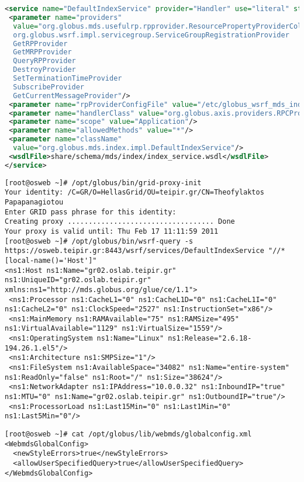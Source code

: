 \begin{lstlisting}[language=XML,caption=Web Service Deployment Descriptor for WSRF Index,label=wsrfwsdd]
<service name="DefaultIndexService" provider="Handler" use="literal" style="document">
 <parameter name="providers"
  value="org.globus.mds.usefulrp.rpprovider.ResourcePropertyProviderCollection
  org.globus.wsrf.impl.servicegroup.ServiceGroupRegistrationProvider
  GetRPProvider
  GetMRPProvider
  QueryRPProvider
  DestroyProvider
  SetTerminationTimeProvider
  SubscribeProvider
  GetCurrentMessageProvider"/>
 <parameter name="rpProviderConfigFile" value="/etc/globus_wsrf_mds_index/rpprovider-config-gluece.xml"/>
 <parameter name="handlerClass" value="org.globus.axis.providers.RPCProvider"/>
 <parameter name="scope" value="Application"/>
 <parameter name="allowedMethods" value="*"/>
 <parameter name="className"
  value="org.globus.mds.index.impl.DefaultIndexService"/>
 <wsdlFile>share/schema/mds/index/index_service.wsdl</wsdlFile>
</service>
\end{lstlisting}

\begin{lstlisting}[caption=WSRF command line query,label=wsrfq]
[root@osweb ~]# /opt/globus/bin/grid-proxy-init
Your identity: /C=GR/O=HellasGrid/OU=teipir.gr/CN=Theofylaktos Papapanagiotou
Enter GRID pass phrase for this identity:
Creating proxy ................................... Done
Your proxy is valid until: Thu Feb 17 11:11:59 2011
[root@osweb ~]# /opt/globus/bin/wsrf-query -s https://osweb.teipir.gr:8443/wsrf/services/DefaultIndexService "//*[local-name()='Host']"
<ns1:Host ns1:Name="gr02.oslab.teipir.gr" ns1:UniqueID="gr02.oslab.teipir.gr" xmlns:ns1="http://mds.globus.org/glue/ce/1.1">
 <ns1:Processor ns1:CacheL1="0" ns1:CacheL1D="0" ns1:CacheL1I="0" ns1:CacheL2="0" ns1:ClockSpeed="2527" ns1:InstructionSet="x86"/>
 <ns1:MainMemory ns1:RAMAvailable="75" ns1:RAMSize="495" ns1:VirtualAvailable="1129" ns1:VirtualSize="1559"/>
 <ns1:OperatingSystem ns1:Name="Linux" ns1:Release="2.6.18-194.26.1.el5"/>
 <ns1:Architecture ns1:SMPSize="1"/>
 <ns1:FileSystem ns1:AvailableSpace="34082" ns1:Name="entire-system" ns1:ReadOnly="false" ns1:Root="/" ns1:Size="38624"/>
 <ns1:NetworkAdapter ns1:IPAddress="10.0.0.32" ns1:InboundIP="true" ns1:MTU="0" ns1:Name="gr02.oslab.teipir.gr" ns1:OutboundIP="true"/>
 <ns1:ProcessorLoad ns1:Last15Min="0" ns1:Last1Min="0" ns1:Last5Min="0"/>
\end{lstlisting}

\begin{lstlisting}[caption=WebMDS global configuration,label=globalconfig]
[root@osweb ~]# cat /opt/globus/lib/webmds/globalconfig.xml 
<WebmdsGlobalConfig>
  <newStyleErrors>true</newStyleErrors>
  <allowUserSpecifiedQuery>true</allowUserSpecifiedQuery>
</WebmdsGlobalConfig>
\end{lstlisting}

